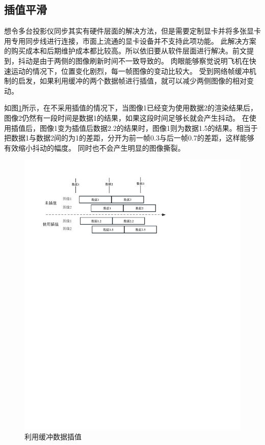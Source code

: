 \subsection{插值平滑}
想令多台投影仪同步其实有硬件层面的解决方法，但是需要定制显卡并将多张显卡用专用同步线进行连接，市面上流通的显卡设备并不支持此项功能。
此解决方案的购买成本和后期维护成本都比较高。所以依旧要从软件层面进行解决。前文提到，抖动是由于两侧的图像刷新时间不一致导致的。
肉眼能够察觉说明飞机在快速运动的情况下，位置变化剧烈，每一帧图像的变动比较大。
受到网络帧缓冲机制的启发，如果利用缓冲的两个数据帧进行插值，就可以减少两侧图像的相对变动。
\par 
如图\ref{lerp}所示，在不采用插值的情况下，当图像1已经变为使用数据2的渲染结果后，图像2仍然有一段时间是数据1的结果，如果这段时间足够长就会产生抖动。
在使用插值后，图像1变为插值后数据2.2的结果时，图像1则为数据1.5的结果。相当于把数据1与数据2间的为1的差距，分开为前一帧0.3与后一帧0.7的差距，这样能够有效缩小抖动的幅度。
同时也不会产生明显的图像撕裂。
\begin{figure}[h!]
    \begin{center}
        \includegraphics[width=\textwidth]{pictures/lerp.pdf}
        \caption{利用缓冲数据插值}
        \label{lerp}
    \end{center}
\end{figure}
\par

